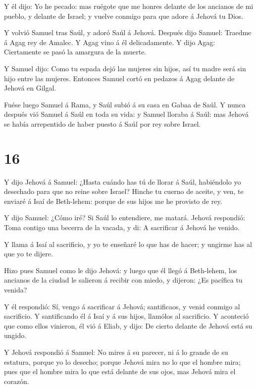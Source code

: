  Y él dijo: Yo he pecado: mas ruégote que me honres delante
de los ancianos de mi pueblo, y delante de Israel; y vuelve conmigo para
que adore á Jehová tu Dios.

 Y volvió Samuel tras Saúl, y adoró Saúl á Jehová.
 Después dijo Samuel: Traedme á Agag rey de Amalec. Y Agag
vino á él delicadamente. Y dijo Agag: Ciertamente se pasó la amargura de
la muerte.

 Y Samuel dijo: Como tu espada dejó las mujeres sin hijos,
así tu madre será sin hijo entre las mujeres. Entonces Samuel cortó en
pedazos á Agag delante de Jehová en Gilgal.

 Fuése luego Samuel á Rama, y Saúl subió á su casa en Gabaa
de Saúl.  Y nunca después vió Samuel á Saúl en toda su
vida: y Samuel lloraba á Saúl: mas Jehová se había arrepentido de haber
puesto á Saúl por rey sobre Israel.

\hypertarget{section-15}{%
\section{16}\label{section-15}}

 Y dijo Jehová á Samuel: ¿Hasta cuándo has tú de llorar á
Saúl, habiéndolo yo desechado para que no reine sobre Israel? Hinche tu
cuerno de aceite, y ven, te enviaré á Isaí de Beth-lehem: porque de sus
hijos me he provisto de rey.

 Y dijo Samuel: ¿Cómo iré? Si Saúl lo entendiere, me matará.
Jehová respondió: Toma contigo una becerra de la vacada, y di: A
sacrificar á Jehová he venido.

 Y llama á Isaí al sacrificio, y yo te enseñaré lo que has
de hacer; y ungirme has al que yo te dijere.

 Hizo pues Samuel como le dijo Jehová: y luego que él llegó
á Beth-lehem, los ancianos de la ciudad le salieron á recibir con miedo,
y dijeron: ¿Es pacífica tu venida?

 Y él respondió: Sí, vengo á sacrificar á Jehová;
santificaos, y venid conmigo al sacrificio. Y santificando él á Isaí y á
sus hijos, llamólos al sacrificio.  Y aconteció que como
ellos vinieron, él vió á Eliab, y dijo: De cierto delante de Jehová está
su ungido.

 Y Jehová respondió á Samuel: No mires á su parecer, ni á lo
grande de su estatura, porque yo lo desecho; porque Jehová mira no lo
que el hombre mira; pues que el hombre mira lo que está delante de sus
ojos, mas Jehová mira el corazón.

